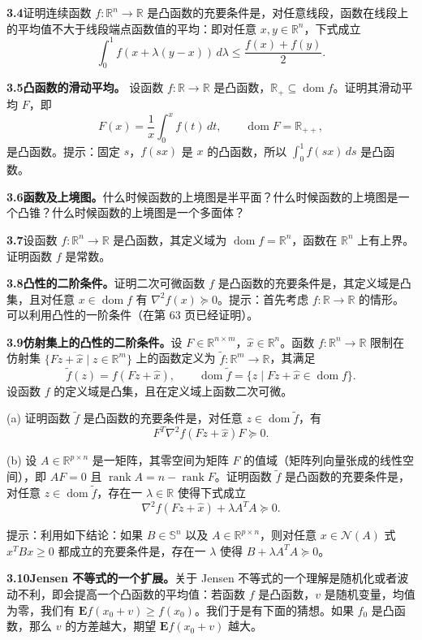 \documentclass[UTF8, 12pt, fontset=fandol, oneside]{ctexart}
\DeclareMathOperator{\dom}{dom}
\begin{document}
\noindent\textbf{3.4}\quad [RV73，第 15 页] 证明连续函数 $f:\mathbb{R}^n\to\mathbb{R}$ 是凸函数的充要条件是，对任意线段，函数在线段上的平均值不大于线段端点函数值的平均：即对任意 $x,y\in\mathbb{R}^n$，下式成立
\[
\int_0^1 f(x+\lambda(y-x))\,d\lambda\leq \frac{f(x)+f(y)}{2}.
\]

\noindent\textbf{3.5}\quad [RV73，第 22 页] \textbf{凸函数的滑动平均。} 设函数 $f:\mathbb{R}\to\mathbb{R}$ 是凸函数，$\mathbb{R}_+\subseteq\dom f$。证明其滑动平均 $F$，即
\[
F(x)=\frac{1}{x}\int_0^x f(t)\,dt,\qquad \dom F=\mathbb{R}_{++},
\]
是凸函数。提示：固定 $s$，$f(sx)$ 是 $x$ 的凸函数，所以 $\int_0^1 f(sx)\,ds$ 是凸函数。

\noindent\textbf{3.6\quad 函数及上境图。}\quad 什么时候函数的上境图是半平面？什么时候函数的上境图是一个凸锥？什么时候函数的上境图是一个多面体？

\noindent\textbf{3.7}\quad 设函数 $f:\mathbb{R}^n\to\mathbb{R}$ 是凸函数，其定义域为 $\dom f=\mathbb{R}^n$，函数在 $\mathbb{R}^n$ 上有上界。证明函数 $f$ 是常数。

\noindent\textbf{3.8\quad 凸性的二阶条件。}\quad 证明二次可微函数 $f$ 是凸函数的充要条件是，其定义域是凸集，且对任意 $x\in\dom f$ 有 $\nabla^2 f(x)\succeq0$。提示：首先考虑 $f:\mathbb{R}\to\mathbb{R}$ 的情形。可以利用凸性的一阶条件（在第 63 页已经证明）。

\noindent\textbf{3.9\quad 仿射集上的凸性的二阶条件。}\quad 设 $F\in\mathbb{R}^{n\times m}$，$\hat x\in\mathbb{R}^n$。函数 $f:\mathbb{R}^n\to\mathbb{R}$ 限制在仿射集 $\{Fz+\hat x\mid z\in\mathbb{R}^m\}$ 上的函数定义为 $\tilde f:\mathbb{R}^m\to\mathbb{R}$，其满足
\[
\tilde f(z)=f(Fz+\hat x),\qquad
\dom\tilde f=\{z\mid Fz+\hat x\in\dom f\}.
\]
设函数 $f$ 的定义域是凸集，且在定义域上函数二次可微。

(a) 证明函数 $\tilde f$ 是凸函数的充要条件是，对任意 $z\in\dom\tilde f$，有
\[
F^T\nabla^2 f(Fz+\hat x)F\succeq0.
\]

(b) 设 $A\in\mathbb{R}^{p\times n}$ 是一矩阵，其零空间为矩阵 $F$ 的值域（矩阵列向量张成的线性空间），即 $AF=0$ 且 $\operatorname{rank}A=n-\operatorname{rank}F$。证明函数 $\tilde f$ 是凸函数的充要条件是，对任意 $z\in\dom\tilde f$，存在一 $\lambda\in\mathbb{R}$ 使得下式成立
\[
\nabla^2 f(Fz+\hat x)+\lambda A^TA\succeq0.
\]

提示：利用如下结论：如果 $B\in\mathbb{S}^n$ 以及 $A\in\mathbb{R}^{p\times n}$，则对任意 $x\in\mathcal{N}(A)$ 式 $x^TBx\geq0$ 都成立的充要条件是，存在一 $\lambda$ 使得 $B+\lambda A^TA\succeq0$。

\noindent\textbf{3.10\quad Jensen 不等式的一个扩展。}\quad 关于 Jensen 不等式的一个理解是随机化或者波动不利，即会提高一个凸函数的平均值：若函数 $f$ 是凸函数，$v$ 是随机变量，均值为零，我们有 $\mathbf{E}f(x_0+v)\geq f(x_0)$。我们于是有下面的猜想。如果 $f_0$ 是凸函数，那么 $v$ 的方差越大，期望 $\mathbf{E}f(x_0+v)$ 越大。
\end{document}
